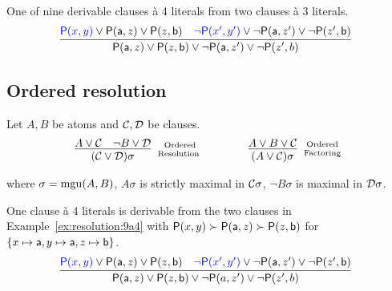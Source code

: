 \begin{example}\label{ex:resolution:9a4}
	One of { nine} derivable clauses à 4 literals from two clauses à 3 literals.
	\begin{gather*}
	\infer[]{\mP(\ma,z)\lor\mP(z,\mb)\lor\lnot\mP(\ma,z')\lor\lnot\mP(z',b)}
	{{\colN\mP(x,y)}\lor\mP(\ma,z)\lor\mP(z,\mb) & {\colN\lnot\mP(x',y')}\lor\lnot\mP(\ma,z')\lor\lnot\mP(z',\mb)}
	\end{gather*}
\end{example}

\subsection{Ordered resolution}\label{sec:ordered:resolution}

\begin{definition}\label{def:ordered:resolution}
	Let \( A, B \) be atoms and \( \mathcal{C},\mathcal{D} \) be clauses.
	\begin{gather*}
	\infer
	[\text{Ordered}\atop\text{Resolution	}]
	{(\mcC\lor\mcD)\sigma}
	{A\lor\mcC&\lnot B\lor\mcD}
	\qquad\qquad
	\infer
	[\text{Ordered}\atop\text{Factoring}]
	{(A\lor\mcC)\sigma}
	{A\lor B\lor\mcC}
	\end{gather*}
	\begin{center}
		where \( \sigma=\operatorname{mgu}(A,B) \),
		\( A\sigma \) is strictly maximal in \( \mathcal{C}\sigma \),
		\( \lnot B\sigma \) is maximal in \( \mathcal{D}\sigma \).
	\end{center}
\end{definition}

\begin{example}\label{ex:resolution:1a4}
	One clause à 4 literals is derivable from the two clauses
	in Example~\vref{ex:resolution:9a4} with
	\( \mathsf{P}(x,y)\succ\mathsf{P}(\mathsf{a},z)\succ\mathsf{P}(z,\mathsf{b}) \)
	for \( \{ x\mapsto\mathsf{a}, y\mapsto\mathsf{a},z\mapsto\mathsf{b} \} \).
	\begin{gather*}
	\infer[]{\mP(\ma,z)\lor\mP(z,\mb)\lor\lnot\mP(a,z')\lor\lnot\mP(z',b)}
	{{\colN\mP(x,y)}\lor\mP(\ma,z)\lor\mP(z,\mb) & {\colN\lnot\mP(x',y')}\lor\lnot\mP(\ma,z')\lor\lnot\mP(z',\mb)}
	\end{gather*}

\end{example}

